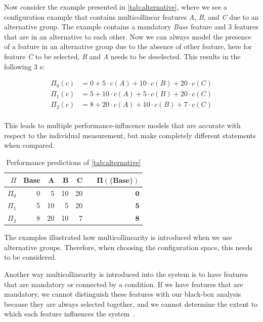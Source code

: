 Now consider the example presented in \autoref{tab:alternative}, 
where we see a configuration example that contains multicollinear features \textit{A}, \textit{B}, and \textit{C} due to an alternative group.
The example contains a mandatory \textit{Base} feature and 3 features that are in an alternative to each other.
Now we can always model the presence of a feature in an alternative group due to the absence of other feature, here for feature \textit{C} to be selected, 
\textit{B} and \textit{A} needs to be deselected. This results in the following 3 {\perfInfluenceModel}s:


\begin{align*}
    \Pi_0(c) &= 0 + 5 \cdot c(A) + 10\cdot c(B) + 20\cdot c(C) \\
    \Pi_1(c) &= 5 + 10 \cdot c(A) + 5\cdot c(B) + 20\cdot c(C) \\
    \Pi_2(c) &= 8 + 20 \cdot c(A) + 10\cdot c(B) + 7\cdot c(C) \\
\end{align*}

This leads to multiple performance-influcence models that are accurate with respect to the individual measurement, 
but make completely different statements when compared.

\begin{table}[h]
    \centering
    \begin{tabular}{rrrrrrr}
    \hline
    $\Pi$ & Base & A & B & C   & &  $\bm{\Pi(\{Base\})}$   \\ \hline
    $\Pi_0$ & 0 & 5  & 10 & 20 & &  $\mathbf{0}$         \\
    $\Pi_1$ & 5 & 10 & 5  & 20 & &  $\mathbf{5}$         \\  
    $\Pi_2$ & 8 & 20 & 10 & 7  & &  $\mathbf{8}$        \\\hline
    \end{tabular}
    \caption{Performance predictions of \autoref{tab:alternative}}\label{tab:Performance-predictions}
\end{table}

The examples illustrated how multicollinearity is introduced when we use alternative groups. 
Therefore, when choosing the configuration space, this needs to be considered. 

Another way multicollinearity is introduced into the system is to have features that are mandatory or connected by a condition. 
If we have features that are mandatory, we cannot distinguish these features with our black-box analysis because they are always selected
together, and we cannot determine the extent to which each feature influences the system~\cite{Multicollinearity}.

